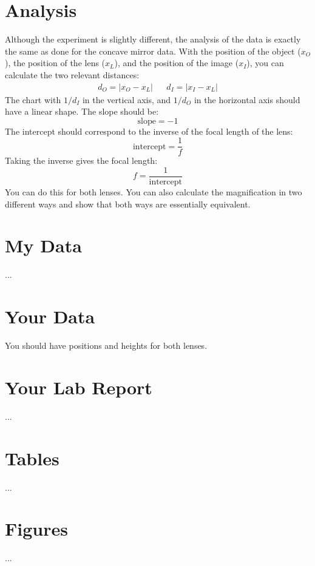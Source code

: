 \section{Analysis}
Although the experiment is slightly different, the analysis of the data is exactly the same as done for the concave mirror data. With the position of the object ($x_{O}$), the position of the lens ($x_{L}$), and the position of the image ($x_{I}$), you can calculate the two relevant distances:
\begin{align}
    d_{O} = \left\vert x_{O} - x_{L} \right\vert && d_{I} = \left\vert x_{I} - x_{L} \right\vert
\end{align}
The chart with $1/d_{I}$ in the vertical axis, and $1/d_{O}$ in the horizontal axis should have a linear shape. The slope should be:
\begin{equation}
    \text{slope} = -1
\end{equation}
The intercept should correspond to the inverse of the focal length of the lens:
\begin{equation}
    \text{intercept} = \frac{1}{f}
\end{equation}
Taking the inverse gives the focal length:
\begin{equation}
    f = \frac{1}{\text{intercept}}
\end{equation}
You can do this for both lenses. You can also calculate the magnification in two different ways and show that both ways are essentially equivalent.
\section{My Data}
...
\section{Your Data}
You should have positions and heights for both lenses.
\newpage
\section{Your Lab Report}
...
\newpage
\section{Tables}
...
\newpage
\section{Figures}
...